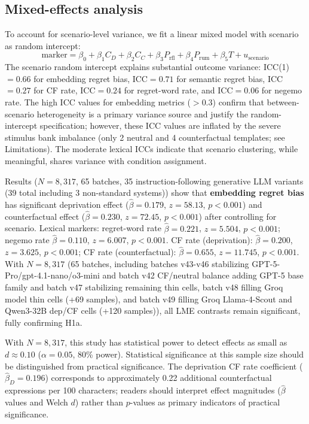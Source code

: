 \documentclass[conference,10pt]{IEEEtran}
\begin{document}
\subsection{Mixed-effects analysis}\label{sec:lme}

To account for scenario-level variance, we fit a linear mixed model with scenario as random intercept:
\begin{equation}
\text{marker} = \beta_0 + \beta_1 C_D + \beta_2 C_C + \beta_3 P_\text{rfl} + \beta_4 P_\text{rum} + \beta_5 T + u_\text{scenario}
\end{equation}
The scenario random intercept explains substantial outcome variance: ICC(1)$=0.66$ for embedding regret bias, ICC$=0.71$ for semantic regret bias, ICC$=0.27$ for CF rate, ICC$=0.24$ for regret-word rate, and ICC$=0.06$ for negemo rate. The high ICC values for embedding metrics ($>0.3$) confirm that between-scenario heterogeneity is a primary variance source and justify the random-intercept specification; however, these ICC values are inflated by the severe stimulus bank imbalance (only 2 neutral and 4 counterfactual templates; see Limitations). The moderate lexical ICCs indicate that scenario clustering, while meaningful, shares variance with condition assignment.

Results ($N=8{,}317$, 65 batches, 35 instruction-following generative LLM variants (39 total including 3 non-standard systems)) show that \textbf{embedding regret bias} has significant deprivation effect ($\hat{\beta}=0.179$, $z=58.13$, $p<0.001$) and counterfactual effect ($\hat{\beta}=0.230$, $z=72.45$, $p<0.001$) after controlling for scenario. Lexical markers: regret-word rate $\hat{\beta}=0.221$, $z=5.504$, $p<0.001$; negemo rate $\hat{\beta}=0.110$, $z=6.007$, $p<0.001$. CF rate (deprivation): $\hat{\beta}=0.200$, $z=3.625$, $p<0.001$; CF rate (counterfactual): $\hat{\beta}=0.655$, $z=11.745$, $p<0.001$. With $N=8{,}317$ (65 batches, including batches v43-v46 stabilizing GPT-5-Pro/gpt-4.1-nano/o3-mini and batch v42 CF/neutral balance adding GPT-5 base family and batch v47 stabilizing remaining thin cells, batch v48 filling Groq model thin cells (+69 samples), and batch v49 filling Groq Llama-4-Scout and Qwen3-32B dep/CF cells (+120 samples)), all LME contrasts remain significant, fully confirming H1a.

With $N=8{,}317$, this study has statistical power to detect effects as small as $d\approx0.10$ ($\alpha=0.05$, 80\% power). Statistical significance at this sample size should be distinguished from practical significance. The deprivation CF rate coefficient ($\hat{\beta}_D=0.196$) corresponds to approximately 0.22 additional counterfactual expressions per 100 characters; readers should interpret effect magnitudes ($\hat{\beta}$ values and Welch $d$) rather than $p$-values as primary indicators of practical significance.
\end{document}
